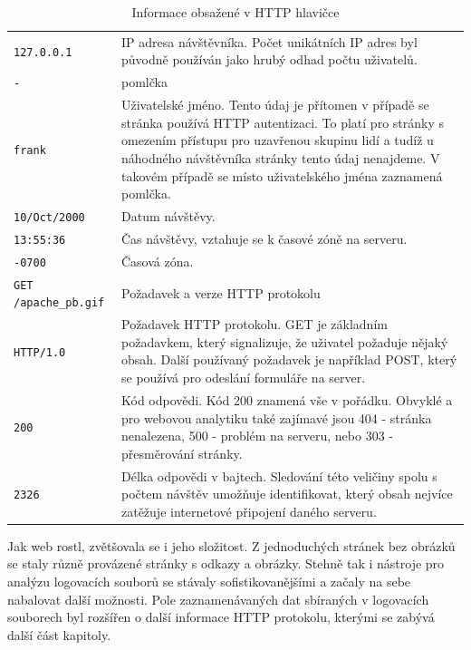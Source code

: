 \documentclass[bc,male,java,dept456]{diploma}						%
\begin{document}
\begin{table}
	\centering      
	\begin{tabular}{ lp{9cm} }
  \verb!127.0.0.1! & IP adresa návštěvníka. Počet unikátních IP adres byl původně používán jako hrubý odhad počtu uživatelů. \\ \bigskip
  \verb!-! & pomlčka \\ \bigskip
  \verb!frank! & Uživatelské jméno. Tento údaj je přítomen v případě se stránka používá HTTP autentizaci. To platí pro stránky s omezením přístupu pro uzavřenou skupinu lidí a tudíž u náhodného návštěvníka stránky tento údaj nenajdeme. V takovém případě se místo uživatelského jména zaznamená pomlčka. \\ \bigskip
  \verb!10/Oct/2000! & Datum návštěvy. \\ \bigskip
  \verb!13:55:36! & Čas návštěvy, vztahuje se k časové zóně na serveru. \\ \bigskip  
  
  \verb!-0700! & Časová zóna. \\ \bigskip
  \verb!GET /apache_pb.gif! & Požadavek a verze HTTP protokolu \\ \bigskip
  \verb!HTTP/1.0! & Požadavek HTTP protokolu. GET je základním požadavkem, který signalizuje, že uživatel požaduje nějaký obsah. Další používaný požadavek je například POST, který se používá pro odeslání formuláře na server.  \\ \bigskip
  
  \verb!200! & Kód odpovědi. Kód 200 znamená vše v pořádku. Obvyklé a pro webovou analytiku také zajímavé jsou 404 - stránka nenalezena, 500 - problém na serveru, nebo 303 - přesměrování stránky. \\ \bigskip
  \verb!2326! & Délka odpovědi v bajtech. Sledování této veličiny spolu s počtem návštěv umožňuje identifikovat, který obsah nejvíce zatěžuje internetové připojení daného serveru.
	\end{tabular}
	\caption{Informace obsažené v HTTP hlavičce}
	\label{tab:http_log_info}
\end{table}






Jak web rostl, zvětšovala se i jeho složitost. Z jednoduchých stránek bez obrázků se staly různě provázené stránky s odkazy a obrázky. Stehně tak i nástroje pro analýzu logovacích souborů se stávaly sofistikovanějšími a začaly na sebe nabalovat další možnosti. Pole zaznamenávaných dat sbíraných v logovacích souborech byl rozšířen o další informace HTTP protokolu, kterými se zabývá další část kapitoly.
\end{document}
